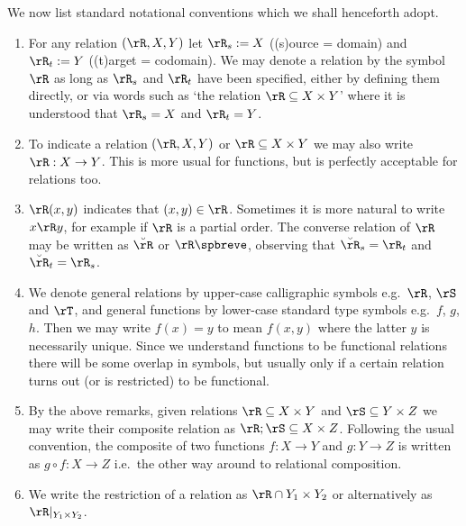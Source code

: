 \documentclass{article}
\begin{document}
\smallskip
We now list standard notational conventions which we shall henceforth adopt.

\begin{notation}
\label{nota:rels_and_funcs}
\item
\begin{enumerate}
\item
For any relation $(\rR,X,Y)$ let $\rR_s := X$ ((s)ource = domain) and $\rR_t := Y$ ((t)arget = codomain). We may denote a relation by the symbol $\rR$ as long as $\rR_s$ and $\rR_t$ have been specified, either by defining them directly, or via words such as `the relation $\rR \subseteq X \times Y$' where it is understood that $\rR_s = X$ and $\rR_t = Y$.

\item
To indicate a relation $(\rR,X,Y)$ or $\rR \subseteq X \times Y$ we may also write $\rR : X \to Y$. This is more usual for functions, but is perfectly acceptable for relations too.

\item
$\rR(x,y)$ indicates that $(x,y) \in \rR$. Sometimes it is more natural to write $x \rR y$, for example if $\rR$ is a partial order.  The converse relation of $\rR$ may be written as $\breve{\rR}$ or $\rR\spbreve$, observing that $\breve{\rR}_s = \rR_t$ and $\breve{\rR}_t = \rR_s$.

\item
We denote general relations by upper-case calligraphic symbols e.g.\ $\rR$, $\rS$ and $\rT$, and general functions by lower-case standard type symbols e.g.\ $f$, $g$, $h$. Then we may write $f(x) = y$ to mean $f(x,y)$ where the latter $y$ is necessarily unique. Since we understand functions to be functional relations there will be some overlap in symbols, but usually only if a certain relation turns out (or is restricted) to be functional. 

\item
By the above remarks, given relations $\rR \subseteq X \times Y$ and $\rS \subseteq Y \times Z$ we may write their composite relation as $\rR ; \rS \subseteq X \times Z$. Following the usual convention, the composite of two functions $f : X \to Y$ and $g : Y \to Z$ is written as $g \circ f : X \to Z$ i.e.\ the other way around to relational composition.

\item
We write the restriction of a relation as $\rR \cap Y_1 \times Y_2$ or alternatively as $\rR |_{Y_1 \times Y_2}$. \endbox

\end{enumerate}
\end{notation}
\end{document}
